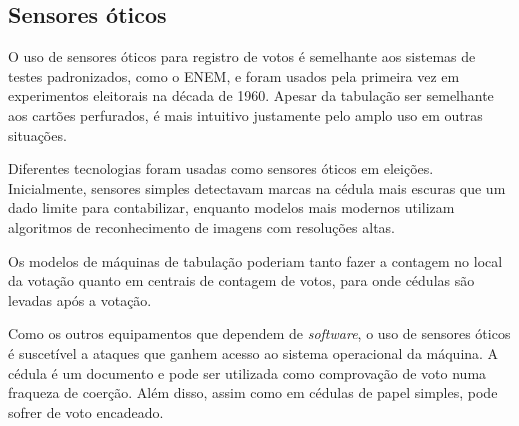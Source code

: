 \subsection{Sensores óticos}

O uso de sensores óticos para registro de votos é semelhante aos sistemas de testes padronizados, como o ENEM, e foram usados pela primeira vez em experimentos eleitorais na década de 1960. Apesar da tabulação ser semelhante aos cartões perfurados, é mais intuitivo justamente pelo amplo uso em outras situações.

Diferentes tecnologias foram usadas como sensores óticos em eleições. Inicialmente, sensores simples detectavam marcas na cédula mais escuras que um dado limite para contabilizar, enquanto modelos mais modernos utilizam algoritmos de reconhecimento de imagens com resoluções altas.

Os modelos de máquinas de tabulação poderiam tanto fazer a contagem no local da votação quanto em centrais de contagem de votos, para onde cédulas são levadas após a votação.

Como os outros equipamentos que dependem de \textit{software}, o uso de sensores óticos é suscetível a ataques que ganhem acesso ao sistema operacional da máquina. A cédula é um documento e pode ser utilizada como comprovação de voto numa fraqueza de coerção. Além disso, assim como em cédulas de papel simples, pode sofrer de voto encadeado.